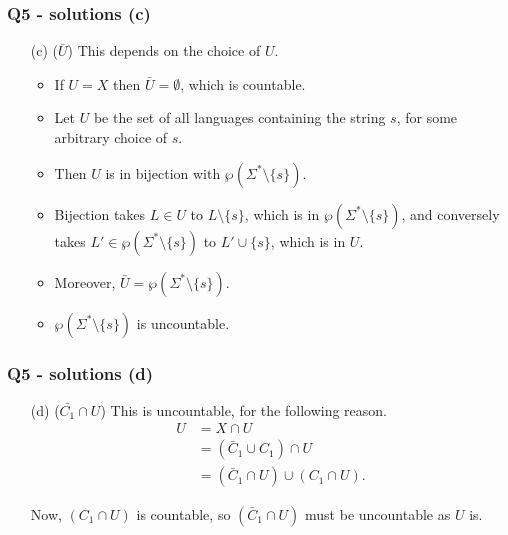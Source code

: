\documentclass[handout]{beamer}
\begin{document}
\begin{frame}
\frametitle{Q5 - solutions (c)}
\begin{enumerate}[]
\item[(c)] ($\bar{U}$) This depends on the choice of $U$. 
\vspace{0.7cm}
\begin{itemize}
\item If $U = X$ then $\bar{U} = \emptyset$, which is countable. 
\vspace{0.3cm}
\item Let $U$ be the set of all languages containing the string $s$, for some arbitrary choice of $s$. 
\vspace{0.3cm}
\item Then $U$ is in bijection with $\wp(\Sigma^*\setminus\{s\})$. 
\vspace{0.3cm}
\item Bijection takes $L\in U$ to $L\setminus\{s\}$, which is in $\wp(\Sigma^*\setminus\{s\})$, and conversely takes $L'\in\wp(\Sigma^*\setminus\{s\})$ to $L'\cup\{s\}$, which is in $U$.
\vspace{0.3cm} 
\item Moreover, $\bar{U} = \wp(\Sigma^*\setminus\{s\})$. 
\vspace{0.3cm}
\item $\wp(\Sigma^*\setminus\{s\})$ is uncountable. 
\end{itemize} 
\end{enumerate}
\end{frame}

\begin{frame}
\frametitle{Q5 - solutions (d)}
\begin{enumerate}[]
\item[(d)] ($\bar{C_1}\cap U$) This is uncountable, for the following reason.
\begin{align*}
U &= X \cap U \\
&=(\bar{C}_1\cup C_1)\cap U \\
&= (\bar{C}_1 \cap U) \cup (C_1\cap U).
\end{align*}

Now, $(C_1\cap U)$ is countable, so $(\bar{C}_1 \cap U)$ must be uncountable as $U$ is. 
\end{enumerate}
\end{frame}
\end{document}
